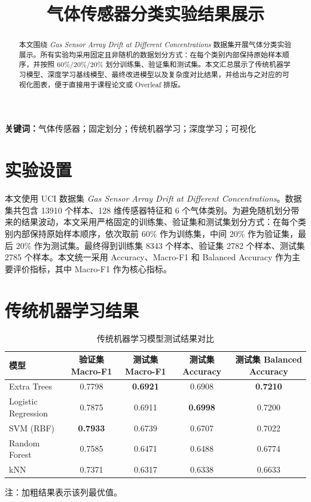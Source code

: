 \documentclass[UTF8,a4paper,12pt]{ctexart}
\title{气体传感器分类实验结果展示}
\author{}
\date{}
\begin{document}
\maketitle

\begin{abstract}
本文围绕 \textit{Gas Sensor Array Drift at Different Concentrations} 数据集开展气体分类实验展示。所有实验均采用固定且非随机的数据划分方式：在每个类别内部保持原始样本顺序，并按照 $60\%/20\%/20\%$ 划分训练集、验证集和测试集。本文汇总展示了传统机器学习模型、深度学习基线模型、最终改进模型以及复杂度对比结果，并给出与之对应的可视化图表，便于直接用于课程论文或 Overleaf 排版。
\end{abstract}

\textbf{关键词：}气体传感器；固定划分；传统机器学习；深度学习；可视化

\section{实验设置}

本文使用 UCI 数据集 \textit{Gas Sensor Array Drift at Different Concentrations}。数据集共包含 13910 个样本、128 维传感器特征和 6 个气体类别。为避免随机划分带来的结果波动，本文采用严格固定的训练集、验证集和测试集划分方式：在每个类别内部保持原始样本顺序，依次取前 $60\%$ 作为训练集，中间 $20\%$ 作为验证集，最后 $20\%$ 作为测试集。最终得到训练集 8343 个样本、验证集 2782 个样本、测试集 2785 个样本。本文统一采用 Accuracy、Macro-F1 和 Balanced Accuracy 作为主要评价指标，其中 Macro-F1 作为核心指标。

\section{传统机器学习结果}

\begin{table}[H]
\centering
\caption{传统机器学习模型测试结果对比}
\label{tab:traditional}
\begin{threeparttable}
\setlength{\tabcolsep}{7pt}
\begin{tabular}{lcccc}
\toprule
模型 & 验证集 Macro-F1 & 测试集 Macro-F1 & 测试集 Accuracy & 测试集 Balanced Accuracy \\
\midrule
Extra Trees & 0.7798 & \textbf{0.6921} & 0.6908 & \textbf{0.7210} \\
Logistic Regression & 0.7875 & 0.6911 & \textbf{0.6998} & 0.7200 \\
SVM (RBF) & \textbf{0.7933} & 0.6739 & 0.6707 & 0.7022 \\
Random Forest & 0.7585 & 0.6471 & 0.6488 & 0.6774 \\
kNN & 0.7371 & 0.6317 & 0.6338 & 0.6633 \\
\bottomrule
\end{tabular}
\begin{tablenotes}[flushleft]
\footnotesize
\item 注：加粗结果表示该列最优值。
\end{tablenotes}
\end{threeparttable}
\end{table}
\end{document}
